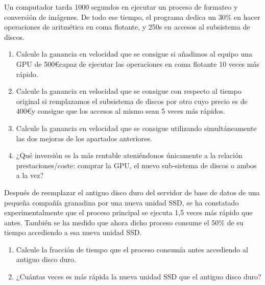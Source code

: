 \begin{ejercicio}
Un computador tarda 1000 segundos en ejecutar un proceso de formateo y conversión de imágenes. De todo ese tiempo, el programa dedica un 30\% en hacer operaciones de aritmética en coma flotante, y 250s en accesos al subsistema de discos.
\begin{enumerate}
    \item Calcule la ganancia en velocidad que se consigue si añadimos al equipo una GPU de 500\euro capaz de ejecutar las operaciones en coma flotante 10 veces más rápido.
    \item Calcule la ganancia en velocidad que se consigue con respecto al tiempo original si remplazamos el subsistema de discos por otro cuyo precio es de 400\euro y consigue que los accesos al mismo sean 5 veces más rápidos.
    \item Calcule la ganancia en velocidad que se consigue utilizando simultáneamente las dos mejoras de los apartados anteriores.
    \item ¿Qué inversión es la más rentable ateniéndonos únicamente a la relación prestaciones/coste: comprar la GPU, el nuevo sub-sistema de discos o ambos a la vez?
\end{enumerate}
\end{ejercicio}

\begin{ejercicio}
Después de reemplazar el antiguo disco duro del servidor de base de datos de una pequeña compañía granadina por una nueva unidad SSD, se ha constatado experimentalmente que el proceso principal se ejecuta 1,5 veces más rápido que antes. También se ha medido que ahora dicho proceso consume el 50\% de su tiempo accediendo a esa nueva unidad SSD.
\begin{enumerate}
    \item Calcule la fracción de tiempo que el proceso consumía antes accediendo al antiguo disco duro.
    \item ¿Cuántas veces es más rápida la nueva unidad SSD que el antiguo disco duro?
\end{enumerate}
\end{ejercicio}

